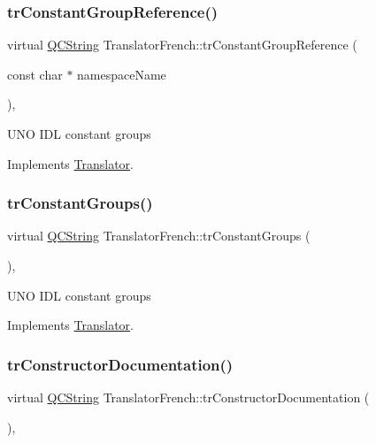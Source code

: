 \subsubsection{\texorpdfstring{trConstantGroupReference()}{trConstantGroupReference()}}
{\footnotesize\ttfamily virtual \mbox{\hyperlink{class_q_c_string}{Q\+C\+String}} Translator\+French\+::tr\+Constant\+Group\+Reference (\begin{DoxyParamCaption}\item[{const char $\ast$}]{namespace\+Name }\end{DoxyParamCaption})\hspace{0.3cm}{\ttfamily [inline]}, {\ttfamily [virtual]}}

U\+NO I\+DL constant groups 

Implements \mbox{\hyperlink{class_translator}{Translator}}.

\mbox{\label{class_translator_french_a030b6a754c5477dc55c559a169c91829}} 
\subsubsection{\texorpdfstring{trConstantGroups()}{trConstantGroups()}}
{\footnotesize\ttfamily virtual \mbox{\hyperlink{class_q_c_string}{Q\+C\+String}} Translator\+French\+::tr\+Constant\+Groups (\begin{DoxyParamCaption}{ }\end{DoxyParamCaption})\hspace{0.3cm}{\ttfamily [inline]}, {\ttfamily [virtual]}}

U\+NO I\+DL constant groups 

Implements \mbox{\hyperlink{class_translator}{Translator}}.

\mbox{\label{class_translator_french_ab83d70c53f7067388fa393c9ac8d5bea}} 
\subsubsection{\texorpdfstring{trConstructorDocumentation()}{trConstructorDocumentation()}}
{\footnotesize\ttfamily virtual \mbox{\hyperlink{class_q_c_string}{Q\+C\+String}} Translator\+French\+::tr\+Constructor\+Documentation (\begin{DoxyParamCaption}{ }\end{DoxyParamCaption})\hspace{0.3cm}{\ttfamily [inline]}, {\ttfamily [virtual]}}

